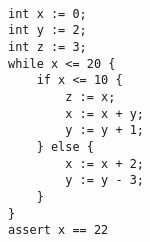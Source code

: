\begin{lstlisting}[]  % Start your code-block
	
int x := 0;
int y := 2;
int z := 3;
while x <= 20 {
    if x <= 10 {
        z := x;
        x := x + y;
        y := y + 1;
    } else {
        x := x + 2;
        y := y - 3;
    }
}
assert x == 22
	\end{lstlisting}